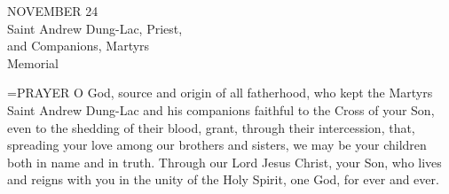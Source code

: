 \begin{center}\normalsize NOVEMBER 24\\
\footnotesize Saint Andrew Dung-Lac, Priest,\\
\footnotesize and Companions, Martyrs\\
\footnotesize Memorial\\
\end{center}

\hangindent=\parindent \small{PRAYER 
O God, source and origin of all fatherhood,
who kept the Martyrs Saint Andrew Dung-Lac and his companions
faithful to the Cross of your Son,
even to the shedding of their blood,
grant, through their intercession,
that, spreading your love among our brothers and sisters,
we may be your children both in name and in truth.
Through our Lord Jesus Christ, your Son,
who lives and reigns with you in the unity of the Holy Spirit,
one God, for ever and ever.\\}
 

